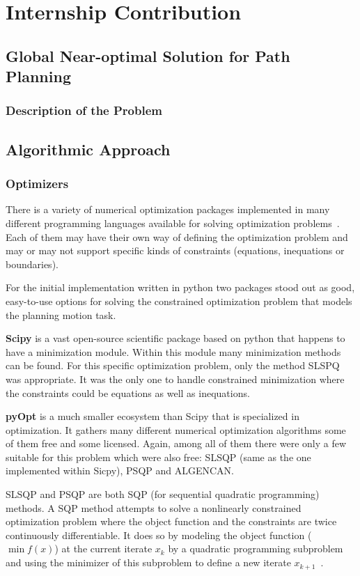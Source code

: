 \part{Internship Contribution}

\chapter{Global Near-optimal Solution for Path Planning}
\lipsum[1]
\section{Description of the Problem}

\chapter{Algorithmic Approach}
\lipsum[1]
\newpage

\section{Optimizers}

There is a variety of numerical optimization packages implemented in many different programming languages available for solving optimization problems~\cite{pyopt-paper}. Each of them may have their own way of defining the optimization problem and may or may not support specific kinds of constraints (equations, inequations or boundaries).

For the initial implementation written in python two packages stood out as good, easy-to-use options for solving the constrained optimization problem that models the planning motion task.

\textbf{Scipy} is a vast open-source scientific package based on python that happens to have a minimization module. Within this module many minimization methods can be found. For this specific optimization problem, only the method SLSPQ was appropriate. It was the only one to handle constrained minimization where the constraints could be equations as well as inequations.

\textbf{pyOpt} is a much smaller ecosystem than Scipy that is specialized in optimization. It gathers many different numerical optimization algorithms some of them free and some licensed. Again, among all of them there were only a few suitable for this problem which were also free: SLSQP (same as the one implemented within Sicpy), PSQP and ALGENCAN.

SLSQP and PSQP are both SQP (for sequential quadratic programming) methods. A SQP method attempts to solve a nonlinearly constrained optimization problem where the object function and the constraints are twice continuously differentiable. It does so by modeling the object function ($\min f(x)$) at the current iterate $x_k$ by a quadratic programming subproblem and using the minimizer of this subproblem to define a new iterate $x_{k+1}$~\cite{Nocedal}.

